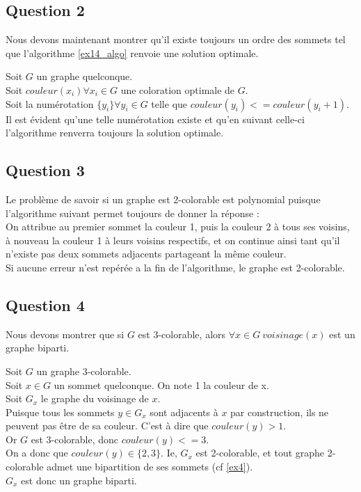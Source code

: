 \subsection{Question 2}\label{ex16_q2}
Nous devons maintenant montrer qu'il existe toujours un ordre des sommets tel que
l'algorithme \ref{ex14_algo} renvoie une solution optimale.

Soit $G$ un graphe quelconque.\\
Soit $couleur(x_i) \forall x_i \in G$ une coloration optimale de $G$.\\
Soit la num\'erotation $\{y_i\} \forall y_i \in G$ telle que $couleur(y_i) <=
couleur(y_i+1)$.\\
Il est \'evident qu'une telle num\'erotation existe et qu'en suivant celle-ci
l'algorithme renverra toujours la solution optimale.

\subsection{Question 3}\label{ex16_q3}
Le probl\`eme de savoir si un graphe est 2-colorable est polynomial puisque l'algorithme
suivant permet toujours de donner la r\'eponse :\\
On attribue au premier sommet la couleur 1, puis la couleur 2 \`a tous ses voisins, \`a
nouveau la couleur 1 \`a leurs voisins respectifs, et on continue ainsi tant qu'il
n'existe pas deux sommets adjacents partageant la m\^eme couleur.\\
Si aucune erreur n'est rep\'er\'ee a la fin de l'algorithme, le graphe est 2-colorable.

\subsection{Question 4}\label{ex16_q4}
Nous devons montrer que si $G$ est 3-colorable, alors $\forall x \in G\ voisinage(x)$ est
un graphe biparti.

Soit $G$ un graphe 3-colorable.\\
Soit $x \in G$ un sommet quelconque. On note 1 la couleur de x.\\
Soit $G_x$ le graphe du voisinage de $x$.\\
Puisque tous les sommets $y \in G_x$ sont adjacents \`a $x$ par construction, ils ne
peuvent pas \^etre de sa couleur. C'est \`a dire que $couleur(y) > 1$.\\
Or $G$ est 3-colorable, donc $couleur(y) <= 3$.\\
On a donc que $couleur(y) \in \{2,3\}$.
Ie, $G_x$ est 2-colorable, et tout graphe 2-colorable admet une bipartition de ses
sommets (cf \ref{ex4}).\\
$G_x$ est donc un graphe biparti.


